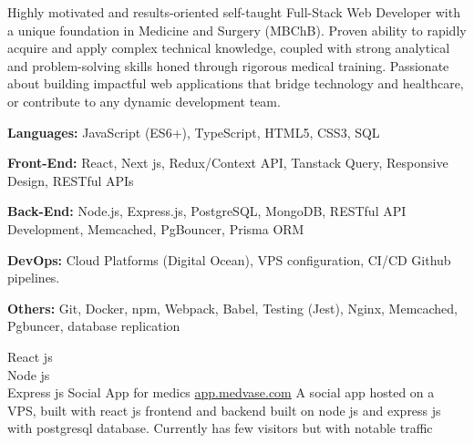 \documentclass[9pt]{developercv} %
\begin{document}
    Highly motivated and results-oriented self-taught Full-Stack Web Developer with a unique foundation in Medicine and Surgery (MBChB). Proven ability to rapidly acquire and apply complex technical knowledge, coupled with strong analytical and problem-solving skills honed through rigorous medical training. Passionate about building impactful web applications that bridge technology and healthcare, or contribute to any dynamic development team.
    
        \textbf{Languages:}
        \thinspace
        JavaScript (ES6+), TypeScript, HTML5, CSS3, SQL
    \vspace{2mm}
    
        \textbf{Front-End:}
        \thinspace
        React, Next js, Redux/Context API, Tanstack Query, Responsive Design, RESTful APIs
    \vspace{2mm}
    
        \textbf{Back-End:}
        \thinspace
        Node.js, Express.js, PostgreSQL, MongoDB, RESTful API Development, Memcached, PgBouncer, Prisma ORM
    \vspace{2mm}
    
        \textbf{DevOps:}
        \thinspace
        Cloud Platforms (Digital Ocean), VPS configuration, CI/CD Github pipelines. 
    \vspace{2mm}
    
        \textbf{Others:}
        \thinspace
        Git, Docker, npm, Webpack, Babel, Testing (Jest), Nginx, Memcached, Pgbuncer, database replication

\begin{entrylist}
    \entry
		{ React js \\ Node js \\ Express js }
		{Social App for medics}
		{\href{https://app.medvase.com}{app.medvase.com}}
		{A social app hosted on a VPS, built with react js frontend and backend built on node js and express js with postgresql database.
        Currently has few visitors but with notable traffic}
\end{entrylist}
\end{document}
